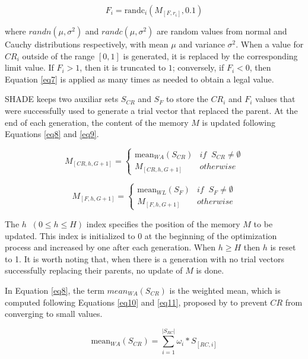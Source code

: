 \documentclass[review]{elsarticle}
\begin{document}
\begin{equation}
F_i = \text{randc}_i(M_{[F,r_i]}, 0.1)
\label{eq7}
\end{equation}

where $randn(\mu, \sigma^2)$ and $randc(\mu, \sigma^2)$ are random values from normal and Cauchy distributions respectively, with mean $\mu$ and variance $\sigma^2$. When a value for $CR_i$ outside of the range $[0,1]$ is generated, it is replaced by the corresponding limit value. If $F_i > 1$, then it is truncated to $1$; conversely, if $F_i < 0$, then Equation \eqref{eq7} is applied as many times as needed to obtain a legal value.

SHADE keeps two auxiliar sets $S_{CR}$ and $S_F$ to store the $CR_i$ and $F_i$ values that were successfully used to generate a trial vector that replaced the parent. At the end of each generation, the content of the memory $M$ is updated following Equations \eqref{eq8} and \eqref{eq9}.

\begin{equation}
M_{[CR,h,G+1]} = \left\{ \begin{array}{lc}
\text{mean}_{WA} (S_{CR}) &   if \;\; S_{CR} \neq \emptyset \\
M_{[CR,h,G+1]} &  otherwise
\end{array}
\right.
\label{eq8}
\end{equation}

\begin{equation}
M_{[F,h,G+1]} = \left\{ \begin{array}{lc}
\text{mean}_{WL} (S_{F}) &   if \;\; S_{F} \neq \emptyset \\
M_{[F,h,G+1]} &  otherwise
\end{array}
\right.
\label{eq9}
\end{equation}

The $h \;\; (0 \le h \le H)$ index specifies the position of the memory $M$ to be updated. This index is initialized to $0$ at the beginning of the optimization process and increased by one after each generation. When $h \ge H$ then $h$ is reset to 1. It is worth noting that, when there is a generation with no trial vectors successfully replacing their parents, no update of $M$ is done.

In Equation \ref{eq8}, the term $mean_{WA} (S_{CR})$ is the weighted mean, which is computed following Equations \eqref{eq10} and \eqref{eq11}, proposed by \cite{peng2009multi} to prevent $CR$ from converging to small values.

\begin{equation}
\text{mean}_{WA} (S_{CR}) = \sum_{i = 1}^{|S_{RC}|} \omega_i * S_{[RC,i]}
\label{eq10}
\end{equation}
\end{document}
